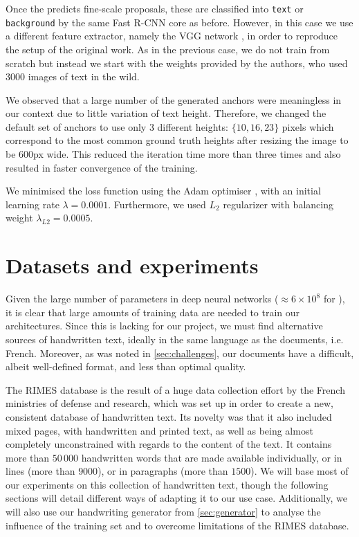 		Once the \CTPN{} predicts fine-scale proposals, these are classified into \texttt{text} or \texttt{back\-ground} by the same Fast R-CNN core as before. However, in this case we use a different feature extractor, namely the VGG network \citep{VGG}, in order to reproduce the setup of the original work. As in the previous case, we do not train from scratch but instead we start with the weights provided by the authors, who used 3000 images of text in the wild.

		We observed that a large number of the generated anchors were meaningless in our context due to little variation of text height. Therefore, we changed the default set of anchors to use only 3 different heights: \(\{10, 16, 23\}\) pixels which correspond to the most common ground truth heights after resizing the image to be 600px wide. This reduced the iteration time more than three times and also resulted in faster convergence of the training.

		We minimised the loss function using the Adam optimiser \citep{adam}, with an initial learning rate \(\lambda = 0.0001\). Furthermore, we used \(L_2\) regularizer with balancing weight \(\lambda_{L2} = 0.0005\).



\section{Datasets and experiments}\label{sec:detection_experiments}
		Given the large number of parameters in deep neural networks (\(\approx 6 \times 10^8\) for \RESNET{}), it is clear that large amounts of training data are needed to train our architectures. Since this is lacking for our project, we must find alternative sources of handwritten text, ideally in the same language as the documents, i.e. French. Moreover, as was noted in \autoref{sec:challenges}, our documents have a difficult, albeit well-defined format, and less than optimal quality.

		The RIMES database \citep{rimes} is the result of a huge data collection effort by the French ministries of defense and research, which was set up in order to create a new, consistent database of handwritten text. Its novelty was that it also included mixed pages, with handwritten and printed text, as well as being almost completely unconstrained with regards to the content of the text.	It contains more than \(50\,000\) handwritten words that are made available individually, or in lines (more than \(9000\)), or in paragraphs (more than \(1500\)). We will base most of our experiments on this collection of handwritten text, though the following sections will detail different ways of adapting it to our use case. Additionally, we will also use our handwriting generator from \autoref{sec:generator} to analyse the influence of the training set and to overcome limitations of the RIMES database.

